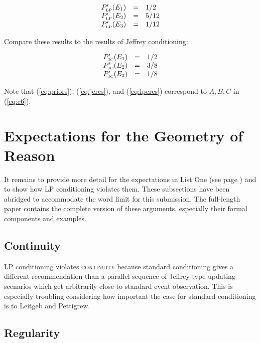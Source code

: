 \documentclass[11pt]{article}
\begin{document}
\begin{equation}
  \label{eq:lpcres}
  \begin{array}{rcl}
    P'_{\mbox{\tiny LP}}(E_{1})&=&1/2 \\
    P'_{\mbox{\tiny LP}}(E_{2})&=&5/12 \\
    P'_{\mbox{\tiny LP}}(E_{3})&=&1/12
  \end{array}
\end{equation}

Compare these results to the results of Jeffrey conditioning:

\begin{equation}
  \label{eq:jcres}
  \begin{array}{rcl}
    P'_{\mbox{\tiny JC}}(E_{1})&=&1/2 \\
    P'_{\mbox{\tiny JC}}(E_{2})&=&3/8 \\
    P'_{\mbox{\tiny JC}}(E_{3})&=&1/8
  \end{array}
\end{equation}

Note that (\ref{eq:priors}), (\ref{eq:jcres}), and (\ref{eq:lpcres})
correspond to $A,B,C$ in (\ref{eq:e6}).

\section{Expectations for the Geometry of Reason}
\label{fivex}

It remains to provide more detail for the expectations in List One
(see page \pageref{page:listone}) and to show how LP conditioning
violates them. These subsections have been abridged to accommodate the
word limit for this submission. The full-length paper contains the
complete version of these arguments, especially their formal
components and examples.

\subsection{Continuity}
\label{Continuity}

LP conditioning violates \textsc{continuity} because standard
conditioning gives a different recommendation than a parallel sequence
of Jeffrey-type updating scenarios which get arbitrarily close to
standard event observation. This is especially troubling considering
how important the case for standard conditioning is to Leitgeb and
Pettigrew.

\subsection{Regularity}
\label{Regularity}
\end{document}
